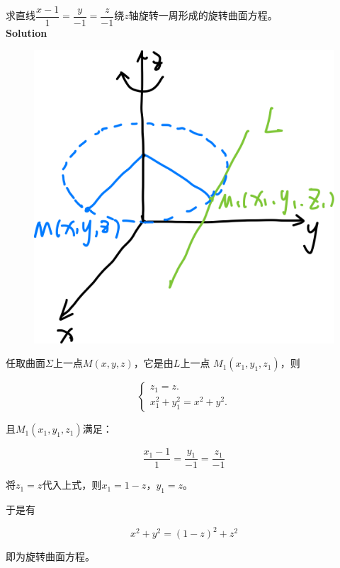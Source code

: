 \documentclass[12pt, a4paper]{article}
\numberwithin{equation}{section}
\begin{document}
    求直线$\dfrac{x-1}{1}=\dfrac{y}{-1}=\dfrac{z}{-1}$绕\(z\)轴旋转一周形成的旋转曲面方程。
    \\

    \textbf{Solution}
    \\

    \begin{figure}
        \centering
        \includegraphics[scale=0.1]{"Chapter 08 images/pic21.png"}
        \label{pic21}
    \end{figure}

    任取曲面\(\Sigma\)上一点\(M\left(x,y,z\right)\)，它是由\(L\)上一点
    \(M_{1}\left(x_1,y_1,z_1\right)\)，则

    $$
        \left\{\begin{array}{l}
        z_1=z . \\
        x_1^2+y_1^2=x^2+y^2 .
        \end{array}\right.
    $$

    且\(M_{1}\left(x_1,y_1,z_1\right)\)满足：

    $$
        \frac{x_1-1}{1}=\frac{y_1}{-1}=\frac{z_1}{-1}
    $$

    将\(z_1 = z\)代入上式，则\(x_1 = 1 - z\)，\(y_1 = z\)。

    于是有

    $$
        x^2+y^2=(1-z)^2+z^2
    $$

    即为旋转曲面方程。
\end{document}
